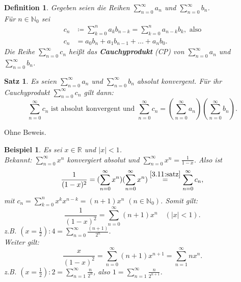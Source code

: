 \documentclass[12pt]{extreport} %
\newcommand{\N}{\mathbb{N}}
\newcommand{\R}{\mathbb{R}}
\theoremstyle{named}
\theoremstyle{itshape}
\newtheorem{satz}[unnamedtheorem]{Satz}
\newtheorem*{definition}{Definition}
\theoremstyle{normal}
\newtheorem*{beispiel*}{Beispiel}
\begin{document}
\begin{definition}
	Gegeben seien die Reihen $\sum_{n=0}^{\infty} a_{n}$ und $\sum_{n=0}^{\infty} b_{n}$. \\
	Für $n \in \N_0$ sei
	\begin{align*}
		c_{n} & \coloneqq \sum_{k=0}^{n} a_{k} b_{n-k} = \sum_{k=0}^{n} a_{n-k} b_{k}, \text{ also} \\
		c_{n} & = a_{0} b_{n} + a_{1} b_{n-1} + \dotsc + a_{n} b_{0}.
	\end{align*} 
	Die Reihe $\sum_{n=0}^{\infty} c_{n}$ hei{\ss}t das \textbf{Cauchyprodukt} (CP) von $\sum_{n=0}^{\infty} a_{n}$ und $\sum_{n=0}^{\infty} b_{n}$.
\end{definition}


\begin{satz} \label{3.11:satz}
Es seien $\sum_{n=0}^{\infty} a_{n}$ und $\sum_{n=0}^{\infty} b_{n}$ absolut konvergent. Für ihr Cauchyprodukt $\sum_{n=0}^{\infty} c_{n}$ gilt dann:
	$$ \sum_{n=0}^{\infty} c_{n} \text{ ist absolut konvergent und } \sum_{n=0}^{\infty} c_{n} = (\sum_{n=0}^{\infty} a_{n}) (\sum_{n=0}^{\infty} b_{n}). $$
\end{satz}

Ohne Beweis.

\begin{beispiel*}
	Es sei $x \in \R$ und $|x| < 1$. \\
	Bekannt: $\sum_{n=0}^{\infty} x^{n}$ konvergiert absolut und	 $\sum_{n=0}^{\infty} x^{n} = \frac{1}{1-x}$. Also ist
	$$ \frac{1}{(1-x)^{2}} = (\sum_{n=0}^{\infty} x^{n})(\sum_{n=0}^{\infty} x^{n}) \overset{\ref{3.11:satz}}{=} \sum_{n=0}^{\infty} c_{n}, $$
	mit $c_{n} = \sum_{k=0}^{n} x^{k} x^{n-k} = (n+1)x^{n}$ $(n \in \N_0)$. Somit gilt:
	$$ \frac{1}{(1-x)^{2}} = \sum_{n=0}^{\infty} (n+1) x^{n} \quad (|x| < 1). $$
	z.B. $(x = \frac{1}{2}): 4 = \sum_{n=0}^{\infty} \frac{(n+1)}{2^{n}}$. \\
	Weiter gilt:
	$$ \frac{x}{(1-x)^{2}} = \sum_{n=0}^{\infty} (n+1) x^{n+1} = \sum_{n=1}^{\infty} n x^{n}. $$
	z.B. $(x = \frac{1}{2}): 2 = \sum_{n=1}^{\infty} \frac{n}{2^{n}}$, also $1 = \sum_{n=1}^{\infty} \frac{n}{2^{n+1}}$.
\end{beispiel*}

\bigskip
\end{document}
